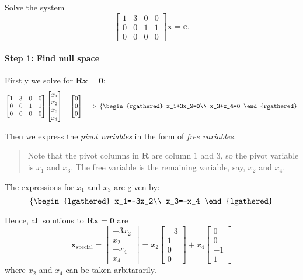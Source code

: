 \begin{example}
Solve the system 
\[
\begin{bmatrix}
1&3&0&0\\0&0&1&1\\0&0&0&0
\end{bmatrix}\bm x = \bm c.
\]
\paragraph{Step 1: Find null space} Firstly we solve for $\bm{Rx} = \bm 0$:
\[
\begin{bmatrix}
1&3&0&0\\0&0&1&1\\0&0&0&0
\end{bmatrix}\begin{bmatrix}
x_1\\x_2\\x_3\\x_4
\end{bmatrix} = \begin{bmatrix}
0\\0\\0
\end{bmatrix}\implies \left\{\begin{rgathered}
x_1+3x_2=0\\
x_3+x_4=0
\end{rgathered}\right.
\]

Then we express the \emph{pivot variables} in the form of \emph{free variables.}
\begin{quotation}
Note that the pivot columns in $\bm R$ are column $1$ and $3$, so the pivot variable is $x_1$ and $x_3$. The free variable is the remaining variable, say, $x_2$ and $x_4$.
\end{quotation}
The expressions for $x_1$ and $x_3$ are given by:
\[
\left\{\begin{lgathered}
x_1=-3x_2\\
x_3=-x_4
\end{lgathered}\right.
\]

Hence, all solutions to $\bm{Rx} = \bm 0$ are
\[
\bm x_{\text{special}} = \begin{bmatrix}
-3x_2\\x_2\\-x_4\\x_4
\end{bmatrix} = x_2\begin{bmatrix}
-3\\1\\0\\0
\end{bmatrix} + x_4\begin{bmatrix}
0\\0\\-1\\1
\end{bmatrix}
\]
where $x_2$ and $x_4$ can be taken arbitararily.

\end{example}
